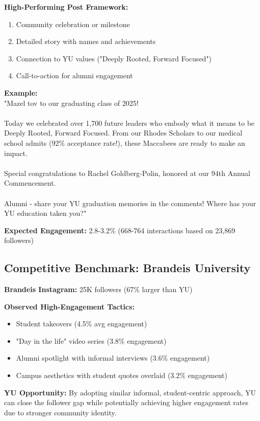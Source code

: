 \documentclass[12pt]{report}
\begin{document}
\textbf{High-Performing Post Framework:}
\begin{enumerate}
    \item Community celebration or milestone
    \item Detailed story with names and achievements
    \item Connection to YU values ("Deeply Rooted, Forward Focused")
    \item Call-to-action for alumni engagement
\end{enumerate}

\textbf{Example:}\\
"Mazel tov to our graduating class of 2025! \\ \\
Today we celebrated over 1,700 future leaders who embody what it means to be Deeply Rooted, Forward Focused. From our Rhodes Scholars to our medical school admits (92\% acceptance rate!), these Maccabees are ready to make an impact. \\ \\
Special congratulations to Rachel Goldberg-Polin, honored at our 94th Annual Commencement. \\ \\
Alumni - share your YU graduation memories in the comments! Where has your YU education taken you?"

\textbf{Expected Engagement:} 2.8-3.2\% (668-764 interactions based on 23,869 followers)

\subsection{Competitive Benchmark: Brandeis University}

\textbf{Brandeis Instagram:} 25K followers (67\% larger than YU)

\textbf{Observed High-Engagement Tactics:}
\begin{itemize}
    \item Student takeovers (4.5\% avg engagement)
    \item "Day in the life" video series (3.8\% engagement)
    \item Alumni spotlight with informal interviews (3.6\% engagement)
    \item Campus aesthetics with student quotes overlaid (3.2\% engagement)
\end{itemize}

\textbf{YU Opportunity:} By adopting similar informal, student-centric approach, YU can close the follower gap while potentially achieving higher engagement rates due to stronger community identity.
\end{document}
